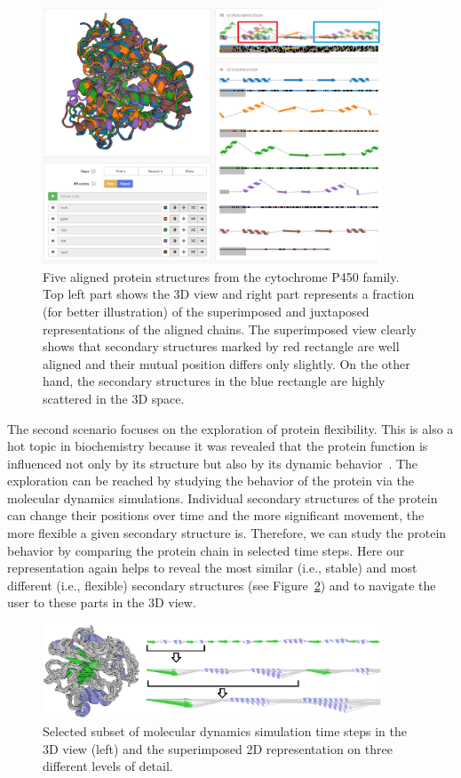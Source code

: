\documentclass[twocolumn]{bmcart}%
\begin{document}
\begin{figure}[hbt]
  \centering
  \includegraphics[width=0.9\textwidth]{pics/five.png}
  \caption{Five aligned protein structures from the cytochrome P450 family. Top left part shows the 3D view and right part represents a fraction (for better illustration) of the superimposed and juxtaposed representations of the aligned chains. The superimposed view clearly shows that secondary structures marked by red rectangle are well aligned and their mutual position differs only slightly. On the other hand, the secondary structures in the blue rectangle are highly scattered in the 3D space.}
  \label{fig:five}
\end{figure}

The second scenario focuses on the exploration of protein flexibility.
This is also a hot topic in biochemistry because it was revealed that the protein function is influenced not only by its structure but also by its dynamic behavior~\cite{Hensen2012}.
The exploration can be reached by studying the behavior of the protein via the molecular dynamics simulations.
Individual secondary structures of the protein can change their positions over time and the more significant movement, the more flexible a given secondary structure is.
Therefore, we can study the protein behavior by comparing the protein chain in selected time steps.
Here our representation again helps to reveal the most similar (i.e., stable) and most different (i.e., flexible) secondary structures (see Figure~\ref{fig:case2}) and to navigate the user to these parts in the 3D view.

\begin{figure}[hbt]
  \centering
  \includegraphics[width=0.9\textwidth]{pics/case2.png}
  \caption{Selected subset of molecular dynamics simulation time steps in the 3D view (left) and the superimposed 2D representation on three different levels of detail.}
  \label{fig:case2}
\end{figure}
\end{document}
